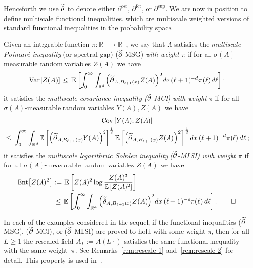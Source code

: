 \documentclass[AHL,Unicode,longabstracts]{cedram}
\newcommand{\R}{\mathbb R}
\newcommand{\expec}[1]{\mathbb{E}\left[#1 \right]}
\newcommand{\parfct}[1]{\partial_{#1}^{\operatorname{fct}}}
\newcommand{\parsup}[1]{\partial_{#1}^{\operatorname{\sup}}}
\newcommand{\osc}{\partial^{\mathrm{osc}}}
\newcommand{\var}[1]{\mathrm{Var}\left[#1\right]}
\newcommand{\ent}[1]{\mathrm{Ent}\!\left[#1\right]}
\newcommand{\cov}[2]{\mathrm{Cov}\left[#1;#2\right]}
\let\oldtilde\tilde
\renewcommand*{\tilde}[1]{\mathchoice{\widetilde{#1}}{\widetilde{#1}}{\oldtilde{#1}}{\oldtilde{#1}}}\let\oldhat\hat
\renewcommand*{\hat}[1]{\mathchoice{\widehat{#1}}{\widehat{#1}}{\oldhat{#1}}{\oldhat{#1}}}\let\oldexists\exists
\renewcommand*{\exists}{\mathrel{\oldexists}}
\begin{document}
Henceforth we use $\tilde\partial$ to denote either $\osc$, $\parfct{}$, or $\parsup{}$. We are now in position to define multiscale functional inequalities, which are multiscale weighted versions of standard functional inequalities in the probability space.
\begin{defi}\label{defi:TFI}
Given an integrable function $\pi:\R_+\to\R_+$, we say that $A$ satisfies the \emph{multiscale Poincaré inequality} (or spectral gap) ($\tilde \partial$-MSG) \emph{with weight $\pi$} if for all $\sigma(A)$-measurable random variables $Z(A)$ we have
\begin{align*}
\var{Z(A)}\,\le \,\expec{\int_0^\infty \int_{\R^d}\Big(\tilde\partial_{A,B_{\ell+1}(x)}Z(A)\Big)^{2}dx\,(\ell+1)^{-d}\pi(\ell)\,d\ell};
\end{align*}
it satisfies the \emph{multiscale covariance inequality \emph{($\tilde\partial$-MCI)} with weight $\pi$} if for all $\sigma(A)$-measurable random variables $Y(A),Z(A)$ we have
\begin{multline*}
\cov{Y(A)}{Z(A)}\\
\,\le\, \int_0^\infty \int_{\R^d}\expec{\Big(\tilde\partial_{A,B_{\ell+1}(x)}Y(A)\Big)^2}^{\frac12}\expec{\Big(\tilde\partial_{A,B_{\ell+1}(x)}Z(A)\Big)^2}^{\frac12}dx \,(\ell+1)^{-d}\pi(\ell)\,d\ell\,;
\end{multline*}
it satisfies the \emph{multiscale logarithmic Sobolev inequality \emph{($\tilde\partial$-MLSI)} with weight $\pi$} if for all $\sigma(A)$-measurable random variables $Z(A)$ we have
\begin{align*}
\ent{Z(A)^2}&:=\,\expec{Z(A)^2\log\frac{Z(A)^2}{\expec{Z(A)^2}}}\\
&\,\le\,\expec{\int_0^\infty \int_{\R^d}\Big(\tilde\partial_{A,B_{\ell+1}(x)}Z(A)\Big)^{2}dx\,(\ell+1)^{-d}\pi(\ell)\,d\ell}.\qedhere
\end{align*}
\end{defi}

\begin{rema}\label{rem:proofplus}
In each of the examples considered in the sequel, if the functional inequalities ($\tilde\partial$-MSG), ($\tilde\partial$-MCI), or ($\tilde\partial$-MLSI) are proved to hold with some weight $\pi$, then for all $L\ge1$ the rescaled field $A_L:=A(L\cdot)$ satisfies the same functional inequality with the same weight~$\pi$. See Remarks~\ref{rem:rescale-1} and~\ref{rem:rescale-2} for detail. This property is used in~\cite{GNO-reg}.
\end{rema}
\end{document}
